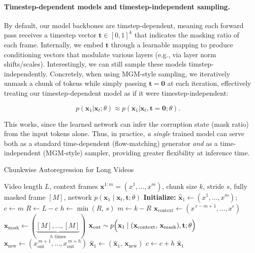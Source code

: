 \paragraph{Timestep-dependent models and timestep-independent sampling.}

By default, our model backbones are timstep-dependent, meaning each forward pass receives a timestep vector $\mathbf{t}\in[0,1]^k$ that indicates the masking ratio of each frame. Internally, we embed $\mathbf{t}$ through a learnable mapping to produce conditioning vectors that modulate various layers (e.g., via layer norm shifts/scales). Interestingly, we can still sample these models timstep-independently. Concretely, when using MGM-style sampling, we iteratively unmask a chunk of tokens while simply passing $\mathbf{t}=\mathbf{0}$ at each iteration, effectively treating our timestep-dependent model as if it were timestep-independent:

\begin{equation}
    p(\mathbf{x}_1|\mathbf{x}_t;\theta) \approx p(\mathbf{x}_1|\mathbf{x}_{t}, \mathbf{t}=\mathbf{0};\theta).
\end{equation}

This works, since the learned network can infer the corruption state (mask ratio) from the input tokens alone. Thus, in practice, \emph{a single} trained model can serve both as a standard time-dependent (flow-matching) generator \emph{and} as a time-independent (MGM-style) sampler, providing greater flexibility at inference time.

\begin{algorithm}[ht!]
\caption{Chunkwise Autoregression for Long Videos}
\label{alg:chunkwise}
\begin{algorithmic}[1]
\REQUIRE Video length \(L\), context frames \(\mathbf{x}^{1:m} = (x^1,\dots,x^m)\), chunk size \(k\), stride \(s\), fully masked frame \([M]\), network \(p(\mathbf{x}_1 \mid \mathbf{x}_t,\mathbf{t};\theta)\)
\STATE \textbf{Initialize:} \(\hat{\mathbf{x}}_{1} \leftarrow (x^1,\dots,x^m)\); \(c \leftarrow m\) 
    \STATE \(R \leftarrow L - c\) 
    \STATE \(h \leftarrow \min(R,\, s)\) 
        \STATE \(m \leftarrow k - R\)
    \ENDIF
    \STATE \(\mathbf{x}_{\mathrm{context}} \leftarrow (x^{\,c-m+1}, \dots, x^c)\)
    \STATE \(\mathbf{x}_{\mathrm{mask}} \leftarrow (\underbrace{[M], \dots, [M]}_{h\text{ times}})\)
    \STATE \(\mathbf{x}_{\mathrm{out}} \sim p\Bigl(\mathbf{x}_1 \mid (\mathbf{x}_{\mathrm{context}},\, \mathbf{x}_{\mathrm{mask}}), \mathbf{t};\theta\Bigr)\)
    \STATE \(\mathbf{x}_{\mathrm{new}} \leftarrow (x_{\mathrm{out}}^{\,m+1}, \dots, x_{\mathrm{out}}^{\,m+h})\)
    \STATE \(\hat{\mathbf{x}}_1 \leftarrow (\hat{\mathbf{x}}_1,\, \mathbf{x}_{\mathrm{new}})\)
    \STATE \(c \leftarrow c + h\)
\ENDWHILE
\RETURN \(\hat{\mathbf{x}}_1\)
\end{algorithmic}
\end{algorithm}

